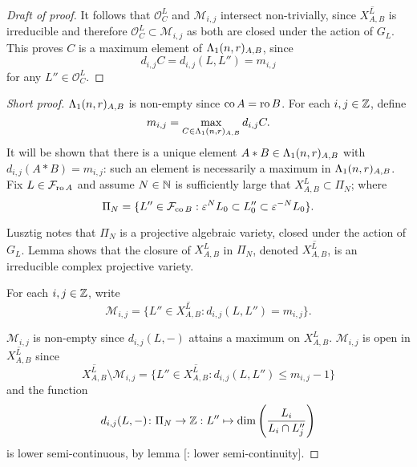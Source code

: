 \documentclass[a4paper, 11pt]{report}
\begin{document}
\begin{proof}[Draft of proof]
It follows that $\mathcal{O}_C^L$ and $\mathcal{M}_{i,j}$ intersect non-trivially, since $\overline{X_{A,B}^L}$ is irreducible and therefore $\mathcal{O}_C^L\subset \mathcal{M}_{i,j}$ as both are closed under the action of $G_L$. This proves $C$ is a maximum element of $\Lambda_1(n,r)_{A,B}$, since
\begin{equation*}
d_{i,j}C = d_{i,j}(L,L'') = m_{i,j}
\end{equation*}
for any $L''\in\mathcal{O}_C^L$.
\end{proof}

\begin{proof}[Short proof]
$\Lambda_1(n,r)_{A,B}$ is non-empty since $\operatorname{co}{A}=\operatorname{ro}{B}$. For each $i,j\in\mathbb{Z}$, define
\begin{equation*}
m_{i,j} = \max_{C\in\Lambda_1(n,r)_{A,B}} d_{i,j}C.
\end{equation*}
It will be shown that there is a unique element $A\ast B\in \Lambda_1(n,r)_{A,B}$ with $d_{i,j}(A\ast B) = m_{i,j}$: such an element is necessarily a maximum in $\Lambda_1(n,r)_{A,B}$. Fix $L\in\mathcal{F}_{\operatorname{ro}{A}}$ and assume $N\in\mathbb{N}$ is sufficiently large that $X_{A,B}^L\subset \Pi_N$; where
\begin{equation*}
\Pi_N = \{L''\in\mathcal{F}_{\operatorname{co}{B}}: \varepsilon^N L_0\subset L_0''\subset \varepsilon^{-N} L_0\}.
\end{equation*}

Lusztig notes \cite{lusztig99} that $\Pi_N$ is a projective algebraic variety, closed under the action of $G_L$. Lemma \needsreference shows that the closure of $X_{A,B}^L$ in $\Pi_N$, denoted $\overline{X_{A,B}^L}$, is an irreducible complex projective variety.

For each $i,j\in\mathbb{Z}$, write
\begin{equation*}
\mathcal{M}_{i,j} = \{L''\in\overline{X_{A,B}^L}: d_{i,j}(L,L'') = m_{i,j}\}.
\end{equation*}

$\mathcal{M}_{i,j}$ is non-empty since $d_{i,j}(L,-)$ attains a maximum on $X_{A,B}^L$. $\mathcal{M}_{i,j}$ is open in $\overline{X_{A,B}^L}$ since
\begin{equation*}
\overline{X_{A,B}^L}\setminus \mathcal{M}_{i,j} = \{L''\in\overline{X_{A,B}^L}: d_{i,j}(L,L'')\le m_{i,j} - 1\}
\end{equation*}
and the function
\begin{equation*}
d_{i,j}(L,-)\colon\Pi_N\to\mathbb{Z} : L''\mapsto \dim\left(\frac{L_i}{L_i\cap L_j''}\right)
\end{equation*}
is lower semi-continuous, by lemma [\needsreference : lower semi-continuity].


\end{proof}
\end{document}
